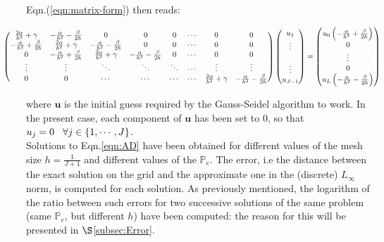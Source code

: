 \documentclass[11pt]{article}
\theoremstyle{theorem}
\theoremstyle{definition}
\begin{document}
Eqn.(\ref{eqn:matrix-form}) then reads:

\begin{align*}
\hspace{-30pt}
	\begin{pmatrix}
	\frac{2\alpha}{h^2}+\gamma & -\frac{\alpha}{h^2}-\frac{\beta}{2h} & 0 & 0 & 0 & \cdots & 0 & 0\\
	-\frac{\alpha}{h^2}+\frac{\beta}{2h} & \frac{2\alpha}{h^2}+\gamma & -\frac{\alpha}{h^2}-\frac{\beta}{2h} & 0 & 0 & \cdots & 0 & 0\\
	0 & -\frac{\alpha}{h^2}+\frac{\beta}{2h} & \frac{2\alpha}{h^2}+\gamma & -\frac{\alpha}{h^2}-\frac{\beta}{2h} & 0 & \cdots & 0 & 0\\
	\vdots & \vdots & \ddots & \ddots & \ddots & \cdots & \vdots & \vdots \\
	0 & 0 & \cdots & \cdots & \cdots & \cdots &  \frac{2\alpha}{h^2}+\gamma & -\frac{\alpha}{h^2}-\frac{\beta}{2h}\\
	\end{pmatrix}
	\begin{pmatrix}
	u_1\\
	\vdots\\
	\\
	\vdots\\
	u_{J-1}\\		
	\end{pmatrix}
	=
	\begin{pmatrix}
	u_0\left(-\frac{\alpha}{h^2}+\frac{\beta}{2h}\right)\\
	0\\
	\vdots\\
	0\\
	u_{L}\left(-\frac{\alpha}{h^2}-\frac{\beta}{2h}\right)\\		
	\end{pmatrix}
\end{align*}

where $\mathbf{u}$ is the initial guess required by the Gauss-Seidel algorithm to work. In the present case, each component of $\mathbf{u}$ has been set to $0$, so that $u_j=0\hspace{3mm}\forall j\in\lbrace 1,\cdots, J\rbrace$.\\
Solutions to  Eqn.\eqref{eqn:AD} have been obtained for different values of the mesh size $h=\frac{1}{J+1}$ and different values of the $\mathbb{P}_e$. The error, i.e the distance between the exact solution on the grid and the approximate one in the (discrete) $L_\infty$ norm, is computed for each solution. As previously mentioned, the logarithm of the ratio between such errors for two successive solutions of the same problem (same $\mathbb{P}_e$, but different $h$) have been computed: the reason for this will be presented in $\S$\ref{subsec:Error}.\\
\end{document}

